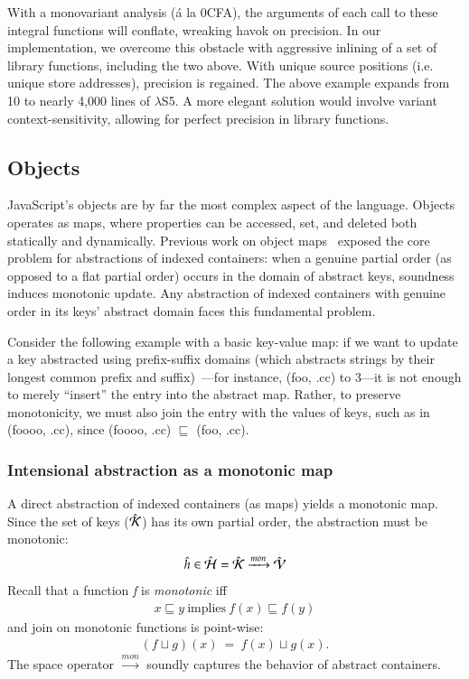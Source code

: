 \documentclass[preprint,9pt]{sigplanconf} %
\begin{document}
With a monovariant analysis (\'{a} la 0CFA), the arguments of each
call to these integral functions will conflate, wreaking havok on
precision. In our implementation, we overcome this obstacle with
aggressive inlining of a set of library functions, including the two
above. With unique source positions (i.e. unique store addresses),
precision is regained. The above example expands from 10 to nearly
4,000 lines of $\lambda$S5. A more elegant solution would involve
variant context-sensitivity, allowing for perfect precision in
library functions.

\subsection{Objects}

JavaScript's objects are by far the most complex aspect of the
language. Objects operates as maps, where properties can be accessed,
set, and deleted both statically and dynamically. Previous work on
object maps~\cite{liang2012hash, fulara2012generic} exposed the core
problem for abstractions of indexed containers: when a genuine partial
order (as opposed to a flat partial order) occurs in the domain of
abstract keys, soundness induces monotonic update. Any abstraction of
indexed containers with genuine order in its keys' abstract domain
faces this fundamental problem.

Consider the following example with a basic key-value map: if we want
to update a key abstracted using prefix-suffix domains (which
abstracts strings by their longest common prefix and
suffix)~\cite{costantini2011static}---for instance, (foo, .cc) to
{3}---it is not enough to merely ``insert'' the entry into the
abstract map. Rather, to preserve monotonicity, we must also join the
entry with the values of keys, such as in (foooo, .cc), since (foooo,
.cc) $\sqsubseteq$ (foo, .cc).

\subsubsection{Intensional abstraction as a monotonic map}
A direct abstraction of indexed containers (as maps) yields a
monotonic map. Since the set of keys ($\hat{\mathcal{K}}$) has its own
partial order, the abstraction must be monotonic:
\begin{align*}
\hat h \in \hat{\mathcal{H}} = \hat{\mathcal{K}} \xrightarrow{mon} \hat{\mathcal{V}}
\end{align*}
Recall that a function \emph{f} is \emph{monotonic} iff
\begin{align*}
x \sqsubseteq y\ \text{implies}\ f(x) \sqsubseteq f(y)
\end{align*}
and join on monotonic functions is point-wise:
\begin{align*}
(f \sqcup g)(x)\ =\ f(x) \sqcup g(x).
\end{align*}
The space operator $\xrightarrow{mon}$ soundly captures the behavior
of abstract containers.
\end{document}
